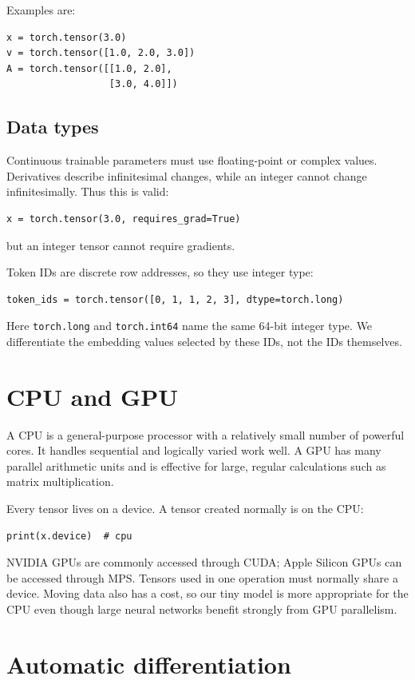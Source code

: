 \documentclass[11pt]{article}
\begin{document}
Examples are:
\begin{lstlisting}
x = torch.tensor(3.0)
v = torch.tensor([1.0, 2.0, 3.0])
A = torch.tensor([[1.0, 2.0],
                  [3.0, 4.0]])
\end{lstlisting}

\subsection{Data types}

Continuous trainable parameters must use floating-point or complex values. Derivatives describe
infinitesimal changes, while an integer cannot change infinitesimally. Thus this is valid:
\begin{lstlisting}
x = torch.tensor(3.0, requires_grad=True)
\end{lstlisting}
but an integer tensor cannot require gradients.

Token IDs are discrete row addresses, so they use integer type:
\begin{lstlisting}
token_ids = torch.tensor([0, 1, 1, 2, 3], dtype=torch.long)
\end{lstlisting}
Here \texttt{torch.long} and \texttt{torch.int64} name the same 64-bit integer type. We differentiate the
embedding values selected by these IDs, not the IDs themselves.

\section{CPU and GPU}

A CPU is a general-purpose processor with a relatively small number of powerful cores. It handles
sequential and logically varied work well. A GPU has many parallel arithmetic units and is effective for
large, regular calculations such as matrix multiplication.

Every tensor lives on a device. A tensor created normally is on the CPU:
\begin{lstlisting}
print(x.device)  # cpu
\end{lstlisting}
NVIDIA GPUs are commonly accessed through CUDA; Apple Silicon GPUs can be accessed through MPS. Tensors
used in one operation must normally share a device. Moving data also has a cost, so our tiny model is more
appropriate for the CPU even though large neural networks benefit strongly from GPU parallelism.

\section{Automatic differentiation}
\end{document}
